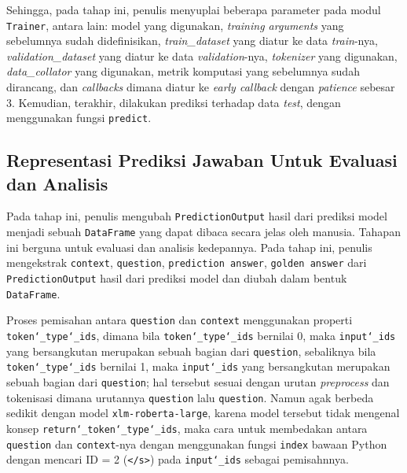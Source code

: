 Sehingga, pada tahap ini, penulis menyuplai beberapa parameter pada modul \texttt{Trainer}, antara lain: model yang digunakan, \emph{training arguments} yang sebelumnya sudah didefinisikan, \emph{train\_dataset} yang diatur ke data \emph{train}-nya, \emph{validation\_dataset} yang diatur ke data \emph{validation}-nya, \emph{tokenizer} yang digunakan, \emph{data\_collator} yang digunakan, metrik komputasi yang sebelumnya sudah dirancang, dan \emph{callbacks} dimana diatur ke \emph{early callback} dengan \emph{patience} sebesar 3. Kemudian, terakhir, dilakukan prediksi terhadap data \emph{test}, dengan menggunakan fungsi \texttt{predict}.

\subsection{Representasi Prediksi Jawaban Untuk Evaluasi dan Analisis}
Pada tahap ini, penulis mengubah \texttt{PredictionOutput} hasil dari prediksi model menjadi sebuah \texttt{DataFrame} yang dapat dibaca secara jelas oleh manusia. Tahapan ini berguna untuk evaluasi dan analisis kedepannya. Pada tahap ini, penulis mengekstrak \texttt{context}, \texttt{question}, \texttt{prediction answer}, \texttt{golden answer} dari \texttt{PredictionOutput} hasil dari prediksi model dan diubah dalam bentuk \texttt{DataFrame}. 

Proses pemisahan antara \texttt{question} dan \texttt{context} menggunakan properti \texttt{token\char`_type\char`_ids}, dimana bila \texttt{token\char`_type\char`_ids} bernilai 0, maka \texttt{input\char`_ids} yang bersangkutan merupakan sebuah bagian dari \texttt{question}, sebaliknya bila \texttt{token\char`_type\char`_ids} bernilai 1, maka \texttt{input\char`_ids} yang bersangkutan merupakan sebuah bagian dari \texttt{question}; hal tersebut sesuai dengan urutan \emph{preprocess} dan tokenisasi dimana urutannya \texttt{question} lalu \texttt{question}. Namun agak berbeda sedikit dengan model \texttt{xlm-roberta-large}, karena model tersebut tidak mengenal konsep \texttt{return\char`_token\char`_type\char`_ids}, maka cara untuk membedakan antara \texttt{question} dan \texttt{context}-nya dengan menggunakan fungsi \texttt{index} bawaan Python dengan mencari ID = 2 (\texttt{</s>}) pada \texttt{input\char`_ids} sebagai pemisahnnya. 

